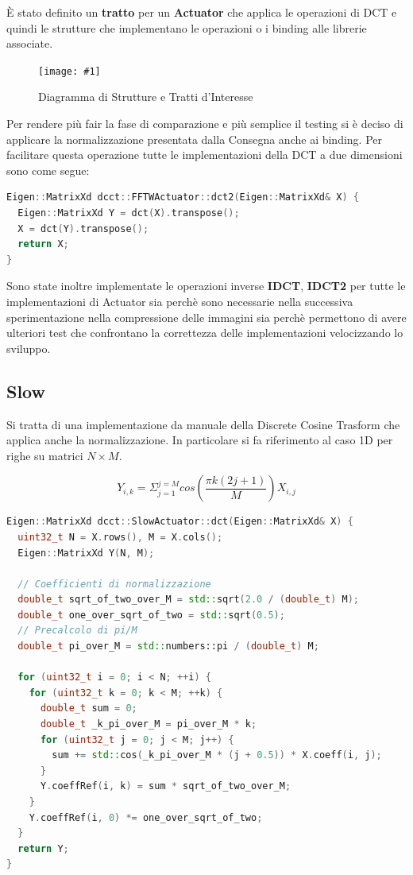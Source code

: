 \documentclass[a4paper,11pt,oneside, table]{article}
\newcommand{\putimage}[4] {
	\begin{figure}[H]
	    \centering
	    \texttt{[image: \#1]}
	    \caption{#2}\label{#3}
	\end{figure}
}
\begin{document}
\`E stato definito un \textbf{tratto} per un \textbf{Actuator} che applica le operazioni di DCT e quindi le strutture che implementano le operazioni o i binding alle librerie associate.

\putimage{images/diagram.png}{Diagramma di Strutture e Tratti d'Interesse}{png:diagram_of_structures}{0.99}

Per rendere pi\`u fair la fase di comparazione e pi\`u semplice il testing si \`e deciso di applicare la normalizzazione presentata dalla Consegna anche ai binding. Per facilitare questa operazione tutte le implementazioni della DCT a due dimensioni sono come segue:

\begin{lstlisting}[language=C++]
Eigen::MatrixXd dcct::FFTWActuator::dct2(Eigen::MatrixXd& X) {
  Eigen::MatrixXd Y = dct(X).transpose();
  X = dct(Y).transpose();
  return X;
}
\end{lstlisting}

Sono state inoltre implementate le operazioni inverse \textbf{IDCT}, \textbf{IDCT2} per tutte le implementazioni di Actuator sia perch\`e sono necessarie nella successiva sperimentazione nella compressione delle immagini sia perch\`e permettono di avere ulteriori test che confrontano la correttezza delle implementazioni velocizzando lo sviluppo.

\subsection{Slow}

Si tratta di una implementazione da manuale della Discrete Cosine Trasform che applica anche la normalizzazione.
In particolare si fa riferimento al caso 1D per righe su matrici $N \times M$.

$$
Y _ {i,k} = \Sigma ^ {j = M} _ {j = 1} cos(\frac {\pi k (2j + 1)} {M}) X_{i, j}
$$

\begin{lstlisting}[language=C++]
Eigen::MatrixXd dcct::SlowActuator::dct(Eigen::MatrixXd& X) {
  uint32_t N = X.rows(), M = X.cols();
  Eigen::MatrixXd Y(N, M);

  // Coefficienti di normalizzazione
  double_t sqrt_of_two_over_M = std::sqrt(2.0 / (double_t) M);
  double_t one_over_sqrt_of_two = std::sqrt(0.5);
  // Precalcolo di pi/M
  double_t pi_over_M = std::numbers::pi / (double_t) M;

  for (uint32_t i = 0; i < N; ++i) {
    for (uint32_t k = 0; k < M; ++k) {
      double_t sum = 0;
      double_t _k_pi_over_M = pi_over_M * k;
      for (uint32_t j = 0; j < M; j++) {
        sum += std::cos(_k_pi_over_M * (j + 0.5)) * X.coeff(i, j);
      }
      Y.coeffRef(i, k) = sum * sqrt_of_two_over_M;
    }
    Y.coeffRef(i, 0) *= one_over_sqrt_of_two;
  }
  return Y;
}
\end{lstlisting}
\end{document}
